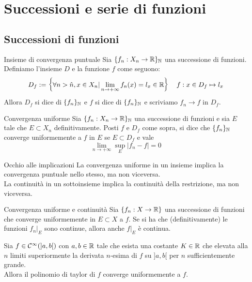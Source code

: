 \documentclass{article}
\begin{document}
\section{Successioni e serie di funzioni}

\subsection{Successioni di funzioni}

\begin{definition}{Insieme di convergenza puntuale}{}
    Sia $\{f_n :X_n\to\mathbb{R}\}_{\mathbb{N}}$ una successione di funzioni. Definiamo l'insieme $D$ e la funzione $f$ come seguono:
    \[D_f := \left\{\forall n>\hat{n}, x \in X_n | \lim_{n\to+\infty} f_n(x) = l_x \in \mathbb{R} \right\} \quad f : x\in D_f \mapsto l_x\]
    Allora $D_f$ si dice  di $\{f_n\}_{\mathbb{N}}$ e $f$ si dice  di $\{f_n\}_{\mathbb{N}}$ e scriviamo $f_n \to f$ in $D_f$.
\end{definition}
    
\begin{definition}{Convergenza uniforme}{}
    Sia $\{f_n :X_n\to\mathbb{R}\}_{\mathbb{N}}$ una successione di funzioni e sia $E$ tale che $E \subset X_n$ definitivamente. Posti $f$ e $D_f$ come sopra, si dice che $\{f_n\}_{\mathbb{N}}$ converge uniformemente a $f$ in $E$ se $E\subset D_f$ e vale
    \[\lim_{n\to +\infty} \sup_E|f_n - f| = 0\]
\end{definition}

\begin{remark}{Occhio alle implicazioni}{}
    La convergenza uniforme in un insieme implica la convergenza puntuale nello stesso, ma non viceversa.\\
    La continuità in un sottoinsieme implica la continuità della restrizione, ma non viceversa.
\end{remark}

\begin{theorem}{Convergenza uniforme e continuità}{}
    Sia $\{f_n : X \to \mathbb{R}\}$ una successione di funzioni che converge uniformemente in $E\subset X$ a $f$. Se si ha che (definitivamente) le funzioni $f_n|_E$ sono continue, allora anche $f|_E$ è continua.
\end{theorem}

\begin{theorem}
    Sia $f \in \mathcal{C}^\infty(]a,b[)$ con $a,b \in \mathbb{R}$ tale che esista una costante $K \in \mathbb{R}$ che elevata alla $n$ limiti superiormente la derivata $n$-esima di $f$ su $]a,b[$ per $n$ sufficientemente grande.\\
    Allora il polinomio di taylor di $f$ converge uniformemente a $f$.
\end{theorem}
\end{document}
